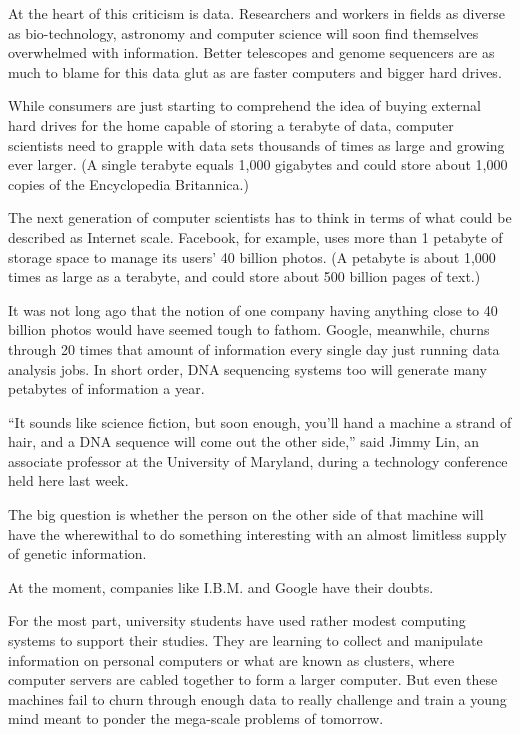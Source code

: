 ﻿\documentclass[12pt]{article}
\begin{document}
At the heart of this criticism is data. Researchers and workers in fields as diverse as
bio-technology, astronomy and computer science will soon find themselves overwhelmed with
information. Better telescopes and genome sequencers are as much to blame for this data
glut\cite{glut} as are faster computers and bigger hard drives.

While consumers are just starting to comprehend the idea of buying external hard drives for the home
capable of storing a terabyte of data, computer scientists need to grapple with data sets thousands
of times as large and growing ever larger. (A single terabyte equals 1,000 gigabytes and could store
about 1,000 copies of the Encyclopedia Britannica.)

The next generation of computer scientists has to think in terms of what could be described as
Internet scale. Facebook, for example, uses more than 1 petabyte of storage space to manage its
users' 40 billion photos. (A petabyte is about 1,000 times as large as a terabyte, and could store
about 500 billion pages of text.)

It was not long ago that the notion of one company having anything close to 40 billion photos would
have seemed tough to fathom. Google, meanwhile, churns through 20 times that amount of information
every single day just running data analysis jobs. In short order, DNA sequencing systems too will
generate many petabytes of information a year.

``It sounds like science fiction, but soon enough, you'll hand a machine a strand of hair, and a DNA
sequence will come out the other side,'' said Jimmy Lin, an associate professor at the University of
Maryland, during a technology conference held here last week.

The big question is whether the person on the other side of that machine will have the wherewithal
to do something interesting with an almost limitless supply of genetic information.

At the moment, companies like I.B.M. and Google have their doubts.

For the most part, university students have used rather modest computing systems to support their
studies. They are learning to collect and manipulate information on personal computers or what are
known as clusters, where computer servers are cabled together to form a larger computer. But even
these machines fail to churn through enough data to really challenge and train a young mind meant to
ponder the mega-scale problems of tomorrow.
\end{document}
